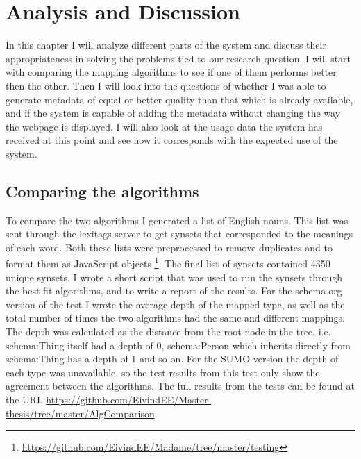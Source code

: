 
\chapter{Analysis and Discussion} %

\label{AnalysisAndDiscussion}


In this chapter I will analyze different parts of the system and discuss their appropriateness in solving the
problems tied to our research question.
I will start with comparing the mapping algorithms to see if one of them performs better then the other.
Then I will look into the questions of whether I was able to generate metadata of equal or better quality than that
which is already available, and if the system is capable of adding the metadata without changing the way the webpage is displayed.
I will also look at the usage data the system has received at this point and see how it corresponds with the expected use of the system.

\section{Comparing the algorithms}
\label{ComparingAlgorithms}
To compare the two algorithms I generated a list of English nouns.
This list was sent through the lexitags server to get synsets that corresponded to the meanings of each word.
Both these lists were preprocessed to remove duplicates and to format them as JavaScript objects
\footnote{\url{https://github.com/EivindEE/Madame/tree/master/testing}}.
The final list of synsets contained 4350 unique synsets.
I wrote a short script that was used to run the synsets through the best-fit algorithms,
and to write a report of the results.
For the schema.org version of the test I wrote the average depth of the mapped type,
as well as the total number of times the two algorithms had the same and different mappings.
The depth was calculated as the distance from the root node in the tree,
i.e. schema:Thing itself had a depth of 0,
schema:Person which inherits directly from schema:Thing has a depth of 1 and so on.
For the SUMO version the depth of each type was unavailable,
so the test results from this test only show the agreement between the algorithms.
The full results from the tests can be found at the URL \url{https://github.com/EivindEE/Master-thesis/tree/master/AlgComparison}.

